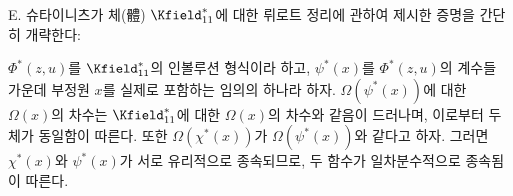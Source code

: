 
E. 슈타이니츠가 체(體) $\Kfield^*_{11}$에 대한 뤼로트 정리에 관하여 제시한 증명을 간단히 개략한다:

$\Phi^*(z,u)$를 $\Kfield^*_{11}$의 인볼루션 형식이라 하고, $\psi^*(x)$를 $\Phi^*(z,u)$의 계수들 가운데 부정원 $x$를 실제로 포함하는 임의의 하나라 하자. $\Omega(\psi^*(x))$에 대한 $\Omega(x)$의 차수는 $\Kfield^*_{11}$에 대한 $\Omega(x)$의 차수와 같음이 드러나며, 이로부터 두 체가 동일함이 따른다. 또한 $\Omega(\chi^*(x))$가 $\Omega(\psi^*(x))$와 같다고 하자. 그러면 $\chi^*(x)$와 $\psi^*(x)$가 서로 유리적으로 종속되므로, 두 함수가 일차분수적으로 종속됨이 따른다.
